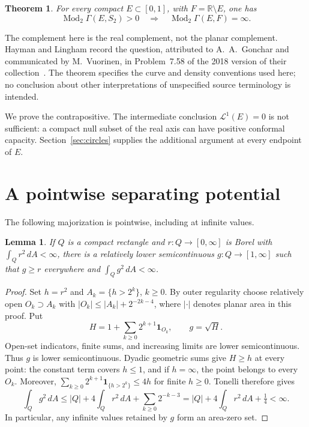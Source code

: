 \documentclass[11pt]{article}
\newtheorem{theorem}{Theorem}
\newtheorem{lemma}{Lemma}
\newcommand{\R}{\mathbb R}
\newcommand{\ind}{\mathbf 1}
\newcommand{\Mod}{\operatorname{Mod}_2}
\newcommand{\length}{\mathcal L^1}
\begin{document}
\begin{theorem}\label{thm:main}
For every compact $E\subset[0,1]$, with $F=\R\setminus E$, one has
\[
 \Mod\Gamma(E,S_2)>0\quad\Longrightarrow\quad
 \Mod\Gamma(E,F)=\infty.
\]
\end{theorem}

The complement here is the real complement, not the planar complement.
Hayman and Lingham record the question, attributed to A.~A.~Gonchar and
communicated by M.~Vuorinen, in Problem~7.58 of the 2018 version of their
collection~\cite{HL}. The theorem specifies the curve and density conventions
used here; no conclusion about other interpretations of unspecified source
terminology is intended.

We prove the contrapositive. The intermediate conclusion $\length(E)=0$
is not sufficient: a compact null subset of the real axis can have positive
conformal capacity. Section~\ref{sec:circles} supplies the additional argument
at every endpoint of $E$.

\section{A pointwise separating potential}

The following majorization is pointwise, including at infinite values.

\begin{lemma}\label{lem:majorant}
If $Q$ is a compact rectangle and $r:Q\to[0,\infty]$ is Borel with
$\int_Qr^2\,dA<\infty$, there is a relatively lower semicontinuous
$g:Q\to[1,\infty]$ such that $g\geq r$ everywhere and
$\int_Qg^2\,dA<\infty$.
\end{lemma}
\begin{proof}
Set $h=r^2$ and $A_k=\{h>2^k\}$, $k\geq0$. By outer regularity choose
relatively open $O_k\supset A_k$ with
$|O_k|\leq|A_k|+2^{-2k-4}$, where $|\cdot|$ denotes planar area in this
proof. Put
\[
 H=1+\sum_{k\geq0}2^{k+1}\ind_{O_k},\qquad g=\sqrt H.
\]
Open-set indicators, finite sums, and increasing limits are lower
semicontinuous. Thus $g$ is lower semicontinuous. Dyadic geometric sums give
$H\geq h$ at every point: the constant term covers $h\leq1$, and if
$h=\infty$, the point belongs to every $O_k$. Moreover,
$\sum_{k\geq0}2^{k+1}\ind_{\{h>2^k\}}\leq4h$ for finite $h\geq0$.
Tonelli therefore gives
\[
 \int_Qg^2\,dA\leq |Q|+4\int_Qr^2\,dA+
       \sum_{k\geq0}2^{-k-3}
 =|Q|+4\int_Qr^2\,dA+\tfrac14<\infty.
\]
In particular, any infinite values retained by $g$ form an area-zero set.
\end{proof}
\end{document}
